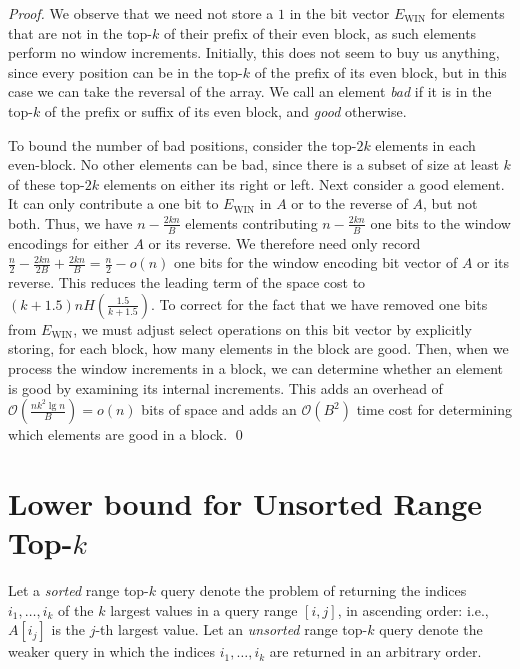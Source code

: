 \documentclass[runningheads]{llncs}
\newcommand{\Oh}{\mathcal{O}}
\begin{document}
\begin{proof}
We observe that we need not store a $1$ in the bit vector
$E_{\text{WIN}}$ for elements that are not in the top-$k$ of their
prefix of their even block, as such elements perform no window
increments.  Initially, this does not seem to buy us anything, since
every position can be in the top-$k$ of the prefix of its even block,
but in this case we can take the reversal of the array.  We call an
element \emph{bad} if it is in the top-$k$ of the prefix or suffix of
its even block, and \emph{good} otherwise.

To bound the number of bad positions, consider the top-$2k$ elements
in each even-block.  No other elements can be bad, since there is a
subset of size at least $k$ of these top-$2k$ elements on either its
right or left.  Next consider a good element.  It can only contribute
a one bit to $E_{\text{WIN}}$ in $A$ or to the reverse of $A$, but not
both.  Thus, we have $n - \frac{2kn}{B}$ elements contributing $n -
\frac{2kn}{B}$ one bits to the window encodings for either $A$ or its
reverse.  We therefore need only record $\frac{n}{2} - \frac{2kn}{2B}
+ \frac{2kn}{B} = \frac{n}{2} - o(n)$ one bits for the window encoding
bit vector of $A$ or its reverse.  This reduces the leading term of
the space cost to $(k + 1.5)n H(\frac{1.5}{k+1.5})$.  To correct for
the fact that we have removed one bits from $E_{\text{WIN}}$, we must
adjust select operations on this bit vector by explicitly storing, for
each block, how many elements in the block are good.  Then, when we
process the window increments in a block, we can determine whether an
element is good by examining its internal increments.  This adds an
overhead of $\Oh(\frac{n k^2 \lg n }{ B}) = o(n)$ bits of space and
adds an $\Oh(B^2)$ time cost for determining which elements are good
in a block. \qed
\end{proof}






\newpage

\appendix

\section{\label{sec:reduction}Lower bound for Unsorted Range Top-\texorpdfstring{$k$}{k}}

Let a \emph{sorted} range top-$k$ query denote the problem of
returning the indices $i_1, \ldots, i_k$ of the $k$ largest values in
a query range $[i,j]$, in ascending order: i.e., $A[i_j]$ is the
$j$-th largest value.  Let an \emph{unsorted} range top-$k$ query
denote the weaker query in which the indices $i_1, \ldots, i_k$ are
returned in an arbitrary order.
\end{document}
